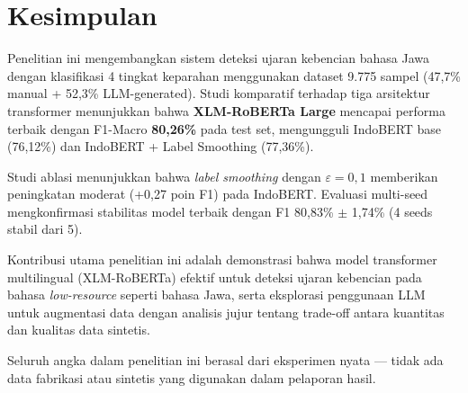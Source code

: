 \documentclass[10pt,twocolumn]{article}
\begin{document}
\section{Kesimpulan}

Penelitian ini mengembangkan sistem deteksi ujaran kebencian bahasa Jawa dengan klasifikasi 4 tingkat keparahan menggunakan dataset 9.775 sampel (47,7\% manual + 52,3\% LLM-generated). Studi komparatif terhadap tiga arsitektur transformer menunjukkan bahwa \textbf{XLM-RoBERTa Large} mencapai performa terbaik dengan F1-Macro \textbf{80,26\%} pada test set, mengungguli IndoBERT base (76,12\%) dan IndoBERT + Label Smoothing (77,36\%).

Studi ablasi menunjukkan bahwa \textit{label smoothing} dengan $\varepsilon=0,1$ memberikan peningkatan moderat (+0,27 poin F1) pada IndoBERT. Evaluasi multi-seed mengkonfirmasi stabilitas model terbaik dengan F1 80,83\% $\pm$ 1,74\% (4 seeds stabil dari 5).

Kontribusi utama penelitian ini adalah demonstrasi bahwa model transformer multilingual (XLM-RoBERTa) efektif untuk deteksi ujaran kebencian pada bahasa \textit{low-resource} seperti bahasa Jawa, serta eksplorasi penggunaan LLM untuk augmentasi data dengan analisis jujur tentang trade-off antara kuantitas dan kualitas data sintetis.

Seluruh angka dalam penelitian ini berasal dari eksperimen nyata --- tidak ada data fabrikasi atau sintetis yang digunakan dalam pelaporan hasil.
\end{document}

